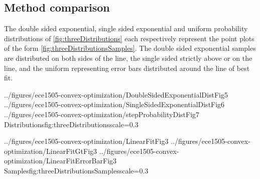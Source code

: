 \subsection{Method comparison}
The double sided exponential, single sided exponential and uniform probability distributions of \cref{fig:threeDistributions} each respectively represent the point plots of the form \cref{fig:threeDistributionsSamples}.  The double sided exponential samples are distributed on both sides of the line, the single sided strictly above or on the line, and the uniform representing error bars distributed around the line of best fit.

\imageThreeFiguresOneLine
{../figures/ece1505-convex-optimization/DoubleSidedExponentialDistFig5}
{../figures/ece1505-convex-optimization/SingleSidedExponentialDistFig6}
{../figures/ece1505-convex-optimization/stepProbabilityDistFig7}
{Distributions}{fig:threeDistributions}{scale=0.3}

\imageThreeFiguresOneLine
{../figures/ece1505-convex-optimization/LinearFitFig3}
{../figures/ece1505-convex-optimization/LinearFitGtFig3}
{../figures/ece1505-convex-optimization/LinearFitErrorBarFig3}
{Samples}{fig:threeDistributionsSamples}{scale=0.3}
